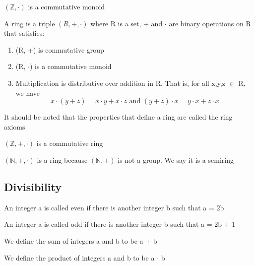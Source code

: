 \documentclass{article}
\begin{document}
\begin{lemma}
    $ (\mathbb{Z} , \cdot) $ is a commutative monoid
\end{lemma}

\begin{definition}[Ring]
    A ring is a triple $ (R,+, \cdot) $ where R is a set, + and $ \cdot $ are binary
    operations on R that satisfies:
    \begin{enumerate}
	\item (R, +) is commutative group
	\item (R, $ \cdot $) is a commutative monoid
	\item Multiplication is distributive over addition in R. That is, for all
	    x,y,z $\in $ R, we have
	    $$ x \cdot (y+z) = x \cdot y + x \cdot z \text{ and }
	    (y+z) \cdot x = y \cdot x + z \cdot x $$
    \end{enumerate}

    It should be noted that the properties that define a ring are called the ring axioms
\end{definition}

\begin{lemma}
    $ (\mathbb{Z} , +, \cdot) $ is a commutative ring
\end{lemma}

\begin{lemma}
    $ (\mathbb{N} , +, \cdot) $ is a ring because $ (\mathbb{N} , +) $ is not a group.
    We say it is a semiring
\end{lemma}

\subsection{Divisibility}

\begin{definition}[Even]
    An integer a is called even if there is another integer b such that a = 2b
\end{definition}

\begin{definition}[Odd]
    An integer a is called odd if there is another integer b such that a = 2b + 1
\end{definition}

\begin{definition}[Sum]
    We define the sum of integers a and b to be a + b
\end{definition}

\begin{definition}[Product]
    We define the product of integers a and b to be a $ \cdot $ b
\end{definition}
\end{document}
